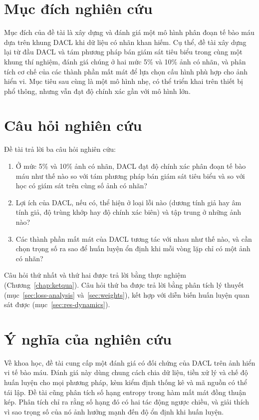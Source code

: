 \section{Mục đích nghiên cứu}

Mục đích của đề tài là xây dựng và đánh giá một mô hình phân đoạn tế bào máu dựa trên khung DACL khi dữ liệu có nhãn khan hiếm. Cụ thể, đề tài xây dựng lại từ đầu DACL và tám phương pháp bán giám sát tiêu biểu trong cùng một khung thí nghiệm, đánh giá chúng ở hai mức 5\% và 10\% ảnh có nhãn, và phân tích cơ chế của các thành phần mất mát để lựa chọn cấu hình phù hợp cho ảnh hiển vi. Mục tiêu sau cùng là một mô hình nhẹ, có thể triển khai trên thiết bị phổ thông, nhưng vẫn đạt độ chính xác gần với mô hình lớn.

\section{Câu hỏi nghiên cứu}
\label{sec:rq}

Đề tài trả lời ba câu hỏi nghiên cứu:
\begin{enumerate}[label=\textbf{CH\arabic*.},leftmargin=1.6cm]
  \item Ở mức 5\% và 10\% ảnh có nhãn, DACL đạt độ chính xác phân đoạn tế bào máu như thế nào so với tám phương pháp bán giám sát tiêu biểu và so với học có giám sát trên cùng số ảnh có nhãn?
  \item Lợi ích của DACL, nếu có, thể hiện ở loại lỗi nào (dương tính giả hay âm tính giả, độ trùng khớp hay độ chính xác biên) và tập trung ở những ảnh nào?
  \item Các thành phần mất mát của DACL tương tác với nhau như thế nào, và cần chọn trọng số ra sao để huấn luyện ổn định khi mỗi vòng lặp chỉ có một ảnh có nhãn?
\end{enumerate}
Câu hỏi thứ nhất và thứ hai được trả lời bằng thực nghiệm (Chương~\ref{chap:ketqua}). Câu hỏi thứ ba được trả lời bằng phân tích lý thuyết (mục~\ref{sec:loss-analysis} và~\ref{sec:weights}), kết hợp với diễn biến huấn luyện quan sát được (mục~\ref{sec:res-dynamics}).

\section{Ý nghĩa của nghiên cứu}

Về khoa học, đề tài cung cấp một đánh giá có đối chứng của DACL trên ảnh hiển vi tế bào máu. Đánh giá này dùng chung cách chia dữ liệu, tiền xử lý và chế độ huấn luyện cho mọi phương pháp, kèm kiểm định thống kê và mã nguồn có thể tái lập. Đề tài cũng phân tích số hạng entropy trong hàm mất mát đồng thuận kép. Phân tích chỉ ra rằng số hạng đó có hai tác động ngược chiều, và giải thích vì sao trọng số của nó ảnh hưởng mạnh đến độ ổn định khi huấn luyện.

